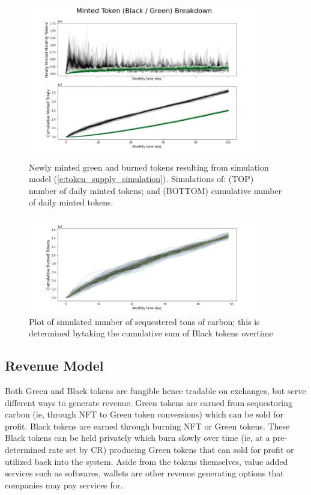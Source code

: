 \documentclass{article}
\begin{document}
\begin{figure}
\centering
\includegraphics[width=4in]{burned_minted.png}
\caption{Newly minted green and burned tokens resulting from simulation model (\ref{e:token_supply_simulation}). Simulations of: (TOP) number of daily minted tokens; and (BOTTOM) cumulative number of daily minted tokens.} 
\label{fig:burned_minted}
\end{figure} 

\begin{figure}
\centering
\includegraphics[width=4in]{burned_tokens.png}
\caption{Plot of simulated number of sequestered tons of carbon; this is determined bytaking the cumulative sum of Black tokens overtime } 
\label{fig:burned_tokens}
\end{figure} 

\subsection{Revenue Model}

Both Green and Black tokens are fungible hence tradable on exchanges, but serve different ways to generate revenue. Green tokens are earned from sequestoring carbon (ie, through NFT to Green token conversions) which can be sold for profit. Black tokens are earned through burning NFT or Green tokens. These Black tokens can be held privately which burn slowly over time (ie, at a pre-determined rate set by CR) producing Green tokens that can sold for profit or utilized back into the system. Aside from the tokens themselves, value added services such as softwares, wallets are other revenue generating options that companies may pay services for.
\end{document}
